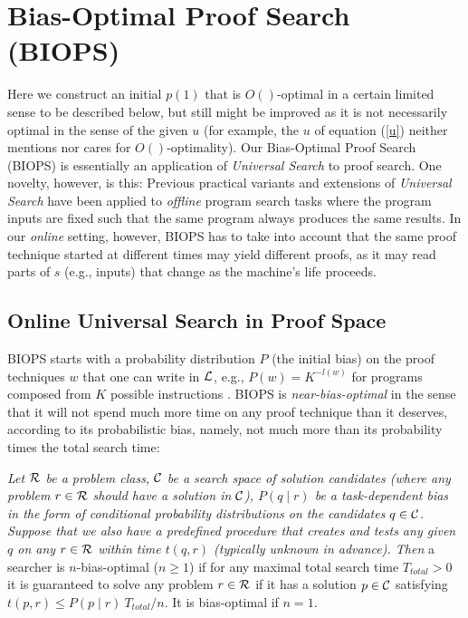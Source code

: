  
\section{Bias-Optimal Proof Search (BIOPS)}
\label{biops}

Here we construct an initial  $p(1)$ that is $O()$-optimal in a certain
limited sense to be described below, but still might be improved
as it is not necessarily optimal in the sense of the given $u$
(for example, the $u$ of equation (\ref{u}) neither mentions
nor cares for $O()$-optimality).
Our Bias-Optimal Proof Search (BIOPS)
is essentially an application of 
{\em Universal Search}
\cite{Levin:73,Levin:84}
to proof search. 
One novelty, however, is this:
Previous practical variants and extensions of {\em Universal
Search} have been applied
\cite{Schmidhuber:95kol,Schmidhuber:97nn,Schmidhuber:97bias,Schmidhuber:04oops}
to {\em offline}
program search tasks where the program inputs are fixed
such that the same program always produces the same results.
In our {\em online} setting, however, BIOPS has to take
into account that the same proof technique 
started at different times may yield different proofs,
as it may read parts of $s$ (e.g., inputs)
that change as the machine's life proceeds. 

\subsection{Online Universal Search in Proof Space}
\label{online}

BIOPS starts with a probability distribution $P$ 
(the initial bias) on the proof techniques $w$ that
one can write in $\cal L$,
e.g., $P(w)=K^{-l(w)}$ for programs composed from $K$
possible instructions  \cite{Levin:84}.
BIOPS is {\em near-bias-optimal} 
\cite{Schmidhuber:04oops}
in the sense that it will not spend 
much more time on any proof technique than it deserves,
according to its probabilistic bias,
namely, not much more than its probability times the total search time:
\begin{definition} 
\label{bias-optimal}
{\em Let $\cal R$ be a problem class,
$\cal C$ be a search space of solution candidates
(where  any problem $r \in \cal R$ should have a solution in $\cal C$),
$P(q \mid r)$ be a task-dependent bias in the form of conditional probability
distributions on the candidates $q \in \cal C$. Suppose that we also have
a predefined procedure that creates and tests any given $q$
on any $r \in \cal R$ within time $t(q,r)$ (typically unknown in advance).
Then} a searcher is $n$-bias-optimal ($n \geq 1$) if
for any maximal total search time $T_{total} > 0$
it is guaranteed to solve any problem $r \in \cal R$
if it has a solution $p \in \cal C$
satisfying $t(p,r) \leq P(p \mid r)~T_{total}/n$.
It is bias-optimal if  $n=1$.
\end{definition}

